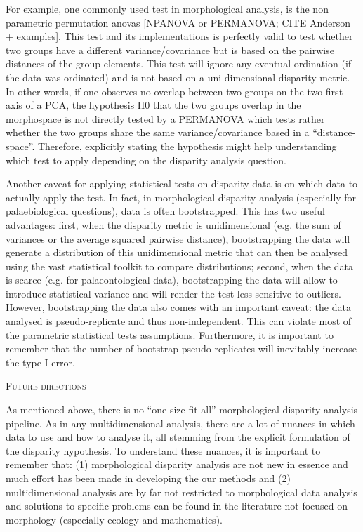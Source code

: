 \documentclass[12pt,letterpaper]{article}
\renewcommand{\section}[1]{%
\bigskip
\begin{center}
\begin{Large}
\normalfont\scshape #1
\medskip
\end{Large}
\end{center}}
\begin{document}
For example, one commonly used test in morphological analysis, is the non parametric permutation anovas [NPANOVA or PERMANOVA; CITE Anderson + examples].
This test and its implementations is perfectly valid to test whether two groups have a different variance/covariance but is based on the pairwise distances of the group elements.
This test will ignore any eventual ordination (if the data was ordinated) and is not based on a uni-dimensional disparity metric.
In other words, if one observes no overlap between two groups on the two first axis of a PCA, the hypothesis H0 that the two groups overlap in the morphospace is not directly tested by a PERMANOVA which tests rather whether the two groups share the same variance/covariance based in a ``distance-space''.
Therefore, explicitly stating the hypothesis might help understanding which test to apply depending on the disparity analysis question.

Another caveat for applying statistical tests on disparity data is on which data to actually apply the test.
In fact, in morphological disparity analysis (especially for palaebiological questions), data is often bootstrapped.
This has two useful advantages: first, when the disparity metric is unidimensional (e.g. the sum of variances or the average squared pairwise distance), bootstrapping the data will generate a distribution of this unidimensional metric that can then be analysed using the vast statistical toolkit to compare distributions; second, when the data is scarce (e.g. for palaeontological data), bootstrapping the data will allow to introduce statistical variance and will render the test less sensitive to outliers.
However, bootstrapping the data also comes with an important caveat: the data analysed is pseudo-replicate and thus non-independent.
This can violate most of the parametric statistical tests assumptions.
Furthermore, it is important to remember that the number of bootstrap pseudo-replicates will inevitably increase the type I error.

\section{Future directions}
As mentioned above, there is no ``one-size-fit-all'' morphological disparity analysis pipeline.
As in any multidimensional analysis, there are a lot of nuances in which data to use and how to analyse it, all stemming from the explicit formulation of the disparity hypothesis.
To understand these nuances, it is important to remember that: (1) morphological disparity analysis are not new in essence and much effort has been made in developing the our methods and (2) multidimensional analysis are by far not restricted to morphological data analysis and solutions to specific problems can be found in the literature not focused on morphology (especially ecology and mathematics).
\end{document}
